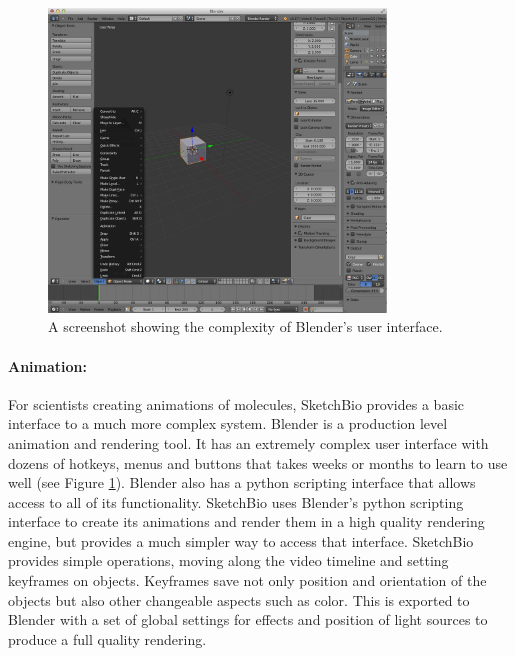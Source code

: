 \documentclass{article} %
\begin{document}
\begin{figure}[h]
\centering
\includegraphics[width=0.8\textwidth]{blender_interface.png}
\caption{A screenshot showing the complexity of Blender's user interface.}
\label{fig:blender_interface}
\end{figure}
\paragraph{Animation:}
For scientists creating animations of molecules, SketchBio provides a basic interface to a much more complex system.  Blender is a production level animation and rendering tool\cite{Blender}.  It has an extremely complex user interface with dozens of hotkeys, menus and buttons that takes weeks or months to learn to use well (see Figure \ref{fig:blender_interface}).  Blender also has a python scripting interface that allows access to all of its functionality.  SketchBio uses Blender's python scripting interface to create its animations and render them in a high quality rendering engine, but provides a much simpler way to access that interface.  SketchBio provides simple operations, moving along the video timeline and setting keyframes on objects.  Keyframes save not only position and orientation of the objects but also other changeable aspects such as color.  This is exported to Blender with a set of global settings for effects and position of light sources to produce a full quality rendering.
\end{document}
